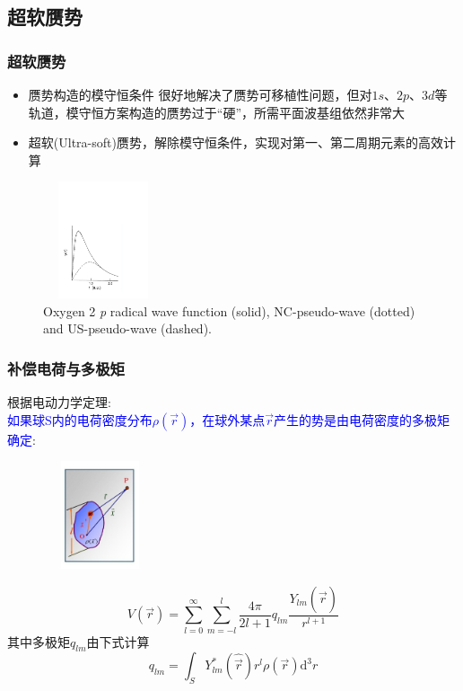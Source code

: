 {\subsection{超软赝势}
\frame
{
\frametitle{超软赝势}
\begin{itemize}
\setlength{\itemsep}{5pt}
	\item 赝势构造的模守恒条件
	很好地解决了赝势可移植性问题，但对$1s$、$2p$、$3d$等轨道，模守恒方案构造的赝势过于“硬”，所需平面波基组依然非常大
	\item 超软\textrm{(Ultra-soft)}赝势，解除模守恒条件，实现对第一、第二周期元素的高效计算
\end{itemize}
\begin{figure}[h!]
\vspace*{-0.10in}
\centering
\includegraphics[height=1.35in,width=1.40in,viewport=30 55 415 500,clip]{Figures/Norm-US-wave.pdf}
\caption{\tiny \textrm{Oxygen 2} \textit{p} \textrm{radical wave function (solid), NC-pseudo-wave (dotted) and US-pseudo-wave (dashed).}}%
\label{Norm-US-wave}
\end{figure}
}

\frame
{
\frametitle{补偿电荷与多极矩}
根据电动力学定理:\\\textcolor{blue}{如果球\textrm{S}内的电荷密度分布$\rho(\vec r)$，在球外某点$\vec r$产生的势是由电荷密度的多极矩确定}:
\begin{figure}[h!]
\vspace*{-15pt}
\centering
\includegraphics[height=1.25in,width=1.32in,viewport=1 22 507 575,clip]{Figures/potential_multipole.jpg}
\label{Potential-multipole}
\end{figure}
\begin{displaymath}
	V(\vec r)=\sum_{l=0}^{\infty}\sum_{m=-l}^{l}\dfrac{4\pi}{2l+1}q_{lm}\dfrac{Y_{lm}(\hat{\vec r})}{r^{l+1}}
\end{displaymath}
其中多极矩$q_{lm}$由下式计算
\begin{displaymath}
	q_{lm}=\int_SY_{lm}^{\ast}(\hat{\vec r})r^l\rho(\vec r)\mathrm{d}^3r
\end{displaymath}
}

}

